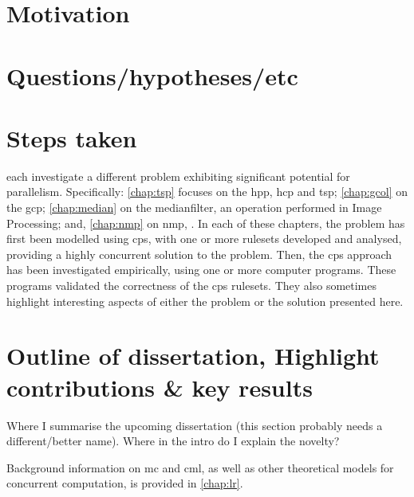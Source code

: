 \section{Motivation}

\section{Questions/hypotheses/etc}

\section{Steps taken}

 each investigate a different problem exhibiting significant potential for parallelism.  Specifically: \cref{chap:tsp} focuses on the \gls{hpp}, \gls{hcp} and \gls{tsp}; \cref{chap:gcol} on the \gls{gcp}; \cref{chap:median} on the \gls{medianfilter}, an operation performed in Image Processing; and, \cref{chap:nmp} on \gls{nmp}, .  In each of these chapters, the problem has first been modelled using \gls{cps}, with one or more \glspl{ruleset} developed and analysed, providing a highly concurrent solution to the problem.  Then, the \gls{cps} approach has been investigated empirically, using one or more computer programs.  These programs validated the correctness of the \gls{cps} \glspl{ruleset}.  They also sometimes highlight interesting aspects of either the problem or the solution presented here.

\section{Outline of dissertation, Highlight contributions \& key results}

\begin{anfxnote}
Where I summarise the upcoming dissertation (this section probably needs a different/better name).  Where in the intro do I explain the novelty?
\end{anfxnote}

Background information on \gls{mc} and \gls{cml}, as well as other theoretical models for concurrent computation, is provided in \cref{chap:lr}.


